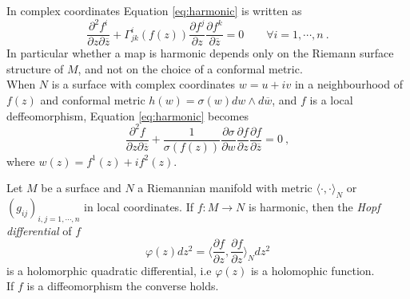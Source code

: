\noindent In complex coordinates Equation \ref{eq:harmonic} is written as
\[
    \frac{\partial^2 f^i}{\partial z \partial \overline{z}} + \Gamma^i_{jk} (f(z)) \frac{\partial f^j}{\partial z} \frac{\partial f^k}{\partial \overline{z}} = 0 \qquad \forall i = 1, \cdots, n \ .
\]
In particular whether a map is harmonic depends only on the Riemann surface structure of $M$, and not on the choice of a conformal metric.\\
When $N$ is a surface with complex coordinates $w = u + iv$ in a neighbourhood of $f(z)$ and conformal metric $h(w) = \sigma(w) dw \wedge d\overline{w}$, and $f$ is a local deffeomorphism, Equation \ref{eq:harmonic} becomes
\begin{equation} \label{eq:harmonic2}
    \frac{\partial^2 f}{ \partial z   \partial \overline{z}} + \frac{1}{\sigma(f(z))} \frac{\partial \sigma}{ \partial w} \frac{\partial f}{\partial z} \frac{\partial f}{\partial \overline{z}} = 0 \ ,
\end{equation}
where $w(z) = f^1(z) + i f^2(z)$.
\begin{theorem} \label{thm:HQD}
    Let $M$ be a surface and $N$ a Riemannian manifold with metric $\langle \cdot,\cdot \rangle_N$ or $(g_{ij})_{i,j = 1, \cdots , n}$ in local coordinates. If $f:M \to N$ is harmonic, then the \textit{Hopf differential} of $f$
    \[
        \varphi(z) dz^2 = \Big\langle \frac{\partial f}{\partial z},  \frac{\partial f}{\partial z} \Big\rangle_N dz^2
    \]
    is a holomorphic quadratic differential, i.e $\varphi(z)$ is a holomophic function. \\
    If $f$ is a diffeomorphism the converse holds.
\end{theorem}
